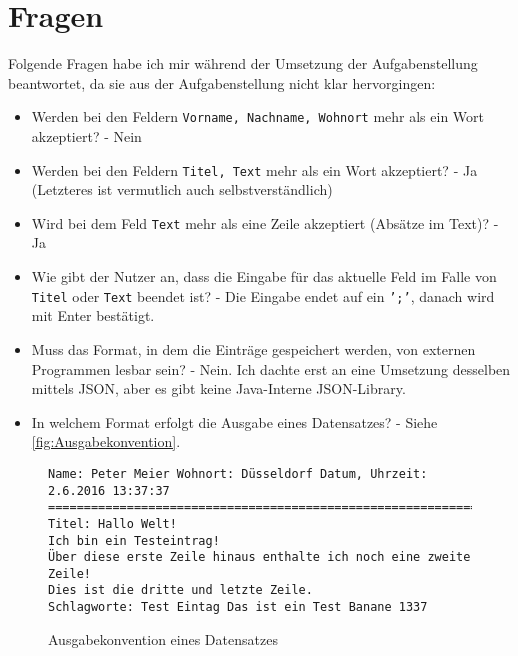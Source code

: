 \documentclass[oneside,12pt]{scrartcl}
\newcommand*{\EnableHyphenationInTexttt}{\hyphenchar\font=45\relax}%
\newcommand{\code}[1]{\textcolor{Firebrick4}{\bcode{#1}}}
\newcommand{\attribute}[1]{\textcolor{SkyBlue3}{\bcode{#1}}}
\newcommand{\bcode}[1]{\texttt{\EnableHyphenationInTexttt#1}}
\begin{document}
\section{Fragen}
Folgende Fragen habe ich mir während der Umsetzung der Aufgabenstellung beantwortet, da sie aus der Aufgabenstellung nicht klar hervorgingen:

\begin{itemize}
\item Werden bei den Feldern \attribute{Vorname, Nachname, Wohnort} mehr als ein Wort akzeptiert? - Nein
\item Werden bei den Feldern \attribute{Titel, Text} mehr als ein Wort akzeptiert? - Ja (Letzteres ist vermutlich auch selbstverständlich)
\item Wird bei dem Feld \attribute{Text} mehr als eine Zeile akzeptiert (Absätze im Text)? - Ja
\item Wie gibt der Nutzer an, dass die Eingabe für das aktuelle Feld im Falle von \attribute{Titel} oder \attribute{Text} beendet ist? - Die Eingabe endet auf ein \code{';'}, danach wird mit Enter bestätigt.
\item Muss das Format, in dem die Einträge gespeichert werden, von externen Programmen lesbar sein? - Nein. Ich dachte erst an eine Umsetzung desselben mittels JSON, aber es gibt keine Java-Interne JSON-Library.
\item In welchem Format erfolgt die Ausgabe eines Datensatzes? - Siehe \autoref{fig:Ausgabekonvention}.
\end{itemize}

\begin{figure}[h]
\begin{verbatim}
Name: Peter Meier Wohnort: Düsseldorf Datum, Uhrzeit: 2.6.2016 13:37:37
=======================================================================
Titel: Hallo Welt!
Ich bin ein Testeintrag!
Über diese erste Zeile hinaus enthalte ich noch eine zweite Zeile!
Dies ist die dritte und letzte Zeile.
Schlagworte: Test Eintag Das ist ein Test Banane 1337 
\end{verbatim}
\caption{Ausgabekonvention eines Datensatzes}
\label{fig:Ausgabekonvention}
\end{figure}
\end{document}
